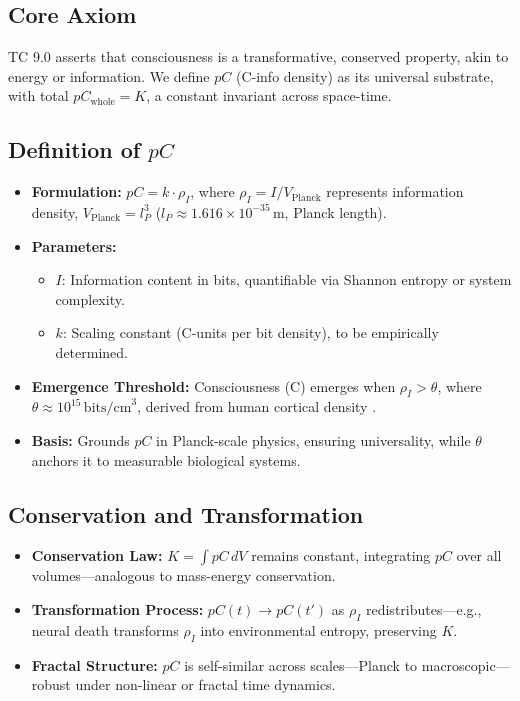 \documentclass[11pt]{article}
\begin{document}
\subsection{Core Axiom}
TC 9.0 asserts that consciousness is a transformative, conserved property, akin to energy or information. We define $pC$ (C-info density) as its universal substrate, with total $pC_{\text{whole}} = K$, a constant invariant across space-time.

\subsection{Definition of $pC$}
\begin{itemize}
    \item \textbf{Formulation:} $pC = k \cdot \rho_I$, where $\rho_I = I / V_{\text{Planck}}$ represents information density, $V_{\text{Planck}} = l_P^3$ ($l_P \approx 1.616 \times 10^{-35} \, \text{m}$, Planck length).
    \item \textbf{Parameters:}
    \begin{itemize}
        \item $I$: Information content in bits, quantifiable via Shannon entropy or system complexity.
        \item $k$: Scaling constant (C-units per bit density), to be empirically determined.
    \end{itemize}
    \item \textbf{Emergence Threshold:} Consciousness (C) emerges when $\rho_I > \theta$, where $\theta \approx 10^{15} \, \text{bits/cm}^3$, derived from human cortical density \citep{laughlin2003communication}.
    \item \textbf{Basis:} Grounds $pC$ in Planck-scale physics, ensuring universality, while $\theta$ anchors it to measurable biological systems.
\end{itemize}

\subsection{Conservation and Transformation}
\begin{itemize}
    \item \textbf{Conservation Law:} $K = \int pC \, dV$ remains constant, integrating $pC$ over all volumes—analogous to mass-energy conservation.
    \item \textbf{Transformation Process:} $pC(t) \rightarrow pC(t')$ as $\rho_I$ redistributes—e.g., neural death transforms $\rho_I$ into environmental entropy, preserving $K$.
    \item \textbf{Fractal Structure:} $pC$ is self-similar across scales—Planck to macroscopic—robust under non-linear or fractal time dynamics.
\end{itemize}
\end{document}
